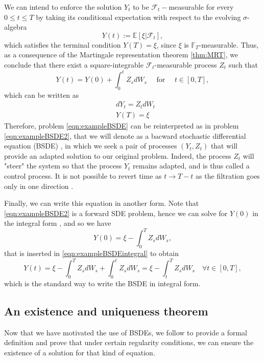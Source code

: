 We can intend to enforce the solution $Y_t$ to be $\mathcal{F}_t-$measurable for every $0 \leq t \leq T $ by taking its conditional expectation with respect to the evolving $\sigma$-algebra
\begin{equation}
	Y(t):=\mathbb{E}[\xi|\mathcal{F}_t],
\end{equation}
which satisfies the terminal condition $Y(T)=\xi$, since $\xi$ is $\mathbb{F}_T$-measurable. Thus, as a consequence of the Martingale representation theorem \ref{thm:MRT}, we conclude that there exist a square-integrable $\mathcal{F}_t$-measurable process $Z_t$ such that 
\begin{equation}
	\label{eqn:exampleBSDEintegral}
	Y(t)=Y(0)+\int_{0}^{t}Z_sdW_s\quad \text{ for } \quad t\in [0,T],
\end{equation}
which can be written as 
\begin{equation}
	\label{eqn:exampleBSDE2}
	\begin{split}
		&dY_t=Z_tdW_t\\
		&Y(T)=\xi
	\end{split}
\end{equation}
Therefore, problem \eqref{eqn:exampleBSDE} can be reinterpreted as in problem \eqref{eqn:exampleBSDE2}, that we will denote as a bacward stochastic differential equation (BSDE) , in which we seek a pair of processes $(Y_t,Z_t)$ that will provide an adapted solution to our original problem. Indeed, the process $Z_t$ will "steer" the system so that the process $Y_t$ remains adapted, and is thus called a control process. It is not possible to revert time as $t\to T-t$ as the filtration goes only in one direction \cite{chessari_numerical_2022}.

Finally, we can write this equation in another form. Note that \eqref{eqn:exampleBSDE2} is a forward SDE problem, hence we can solve for $Y(0)$ in the integral form , and so we have
\begin{equation}
	Y(0)=\xi-\int_{0}^{T}Z_sdW_s,
\end{equation}
that is inserted in \eqref{eqn:exampleBSDEintegral} to obtain
\begin{equation}
	Y(t)=\xi-\int_{0}^{T}Z_sdW_s+\int_{0}^{t}Z_sdW_s=\xi -\int_{t}^{T}Z_sdW_s \quad \forall t\in[0,T],
\end{equation}
which is the standard way to write the BSDE in integral form.
\subsection{An existence and uniqueness theorem}
Now that we have motivated the use of BSDEs, we follow \cite{pham_continuous-time_2009} to provide a formal definition and prove that under certain regularity conditions, we can ensure the existence of a solution for that kind of equation.

